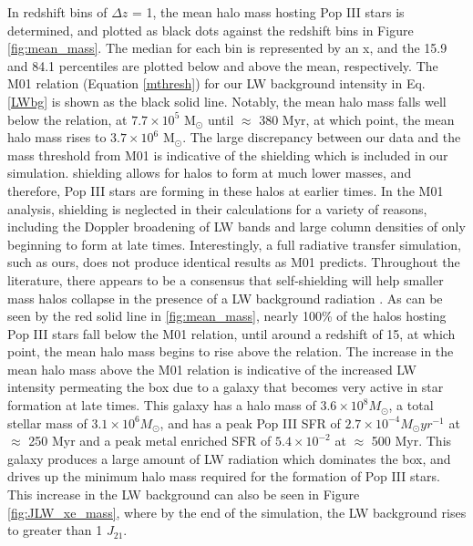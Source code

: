 \documentclass[a4paper,fleqn,usenatbib]{mnras}
\begin{document}
In redshift bins of $\Delta z$ = 1, the mean halo mass hosting Pop III stars is determined, and plotted as black dots against the redshift bins in Figure \ref{fig:mean_mass}. The median for each bin is represented by an x, and the 15.9 and 84.1 percentiles are plotted below and above the mean, respectively. The M01 relation (Equation \ref{mthresh}) for our LW background intensity in Eq. \ref{LWbg} is shown as the black solid line. Notably, the mean halo mass falls well below the relation, at $7.7 \times 10^{5}$ M$_{\odot}$ until $\approx$ 380 Myr, at which point, the mean halo mass rises to $3.7 \times 10^{6}$ M$_{\odot}$. The large discrepancy between our data and the mass threshold from M01 is indicative of the \hh{} shielding which is included in our simulation. \hh{} shielding allows for halos to form at much lower masses, and therefore, Pop III stars are forming in these halos at earlier times. In the M01 analysis, \hh{} shielding is neglected in their calculations for a variety of reasons, including the Doppler broadening of LW bands and large column densities of \hh{} only beginning to form at late times. Interestingly, a full radiative transfer simulation, such as ours, does not produce identical results as M01 predicts. Throughout the literature, there appears to be a consensus that \hh{} self-shielding will help smaller mass halos collapse in the presence of a LW background radiation \citep[E.g.][]{Yoshida03, Ricotti01, Glover01, Hartwig15}. As can be seen by the red solid line in \ref{fig:mean_mass}, nearly 100\% of the halos hosting Pop III stars fall below the M01 relation, until around a redshift of 15, at which point, the mean halo mass begins to rise above the relation. The increase in the mean halo mass above the M01 relation is indicative of the increased LW intensity permeating the box due to a galaxy that becomes very active in star formation at late times. This galaxy has a halo mass of $3.6 \times 10^{8} M_{\odot}$, a total stellar mass of $3.1 \times 10^{6} M_{\odot}$, and has a peak Pop III SFR of $2.7 \times 10^{-4} M_{\odot} yr^{-1}$ at $\approx$ 250 Myr and a peak metal enriched SFR of $5.4 \times 10^{-2}$ at $\approx$ 500 Myr. This galaxy produces a large amount of LW radiation which dominates the box, and drives up the minimum halo mass required for the formation of Pop III stars. This increase in the LW background can also be seen in Figure \ref{fig:JLW_xe_mass}, where by the end of the simulation, the LW background rises to greater than 1 $J_{21}$.
\end{document}
